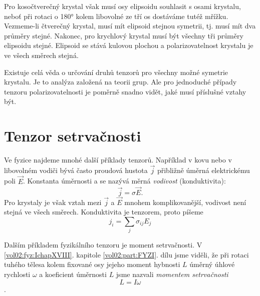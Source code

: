     Pro kosočtverečný krystal však musí osy elipsoidu souhlasit s osami krystalu, neboť při rotaci o
    \ang{180} kolem libovolné ze tří os dostáváme tutéž mřížku. Vezmeme-li čtverečný krystal, musí
    mít elipsoid stejnou symetrii, tj. musí mít dva průměry stejné. Nakonec, pro krychlový krystal
    musí být všechny tři průměry elipsoidu stejné. Elipsoid se stává kulovou plochou a
    polarizovatelnost krystalu je ve všech směrech stejná.
    
    Existuje celá věda o určování druhů tenzorů pro všechny možné symetrie krystalu. Je to analýza
    založená na teorii grup. Ale pro jednoduché případy tenzoru polarizovatelnosti je poměrně snadno
    vidět, jaké musí příslušné vztahy být.

  \section{Tenzor setrvačnosti}\label{fyz:IIchapXXXIsecIV} 
  
    Ve fyzice najdeme mnohé další příklady tenzorů. Například v kovu nebo v libovolném vodiči bývá
    často proudová hustota \(\vec{j}\) přibližně úměrná elektrickému poli \(\vec{E}\). Konstanta
    úměrnosti a se nazývá měrná \emph{vodivost} (konduktivita):
    \begin{equation*}
      \vec{j} = \sigma\vec{E}.
    \end{equation*}
    Pro krystaly je však vztah mezi \(\vec{j}\) a \(\vec{E}\) mnohem komplikovanější, vodivost není
    stejná ve všech směrech. Konduktivita je tenzorem, proto píšeme
    \begin{equation*}
      j_i = \sum_j\sigma_{ij}E_j
    \end{equation*}

    Dalším příkladem fyzikálního tenzoru je moment setrvačnosti. V \ref{vol02:fyz:IchapXVIII}. kapitole
    \ref{vol02:part:FYZI}. dílu jsme viděli, že při rotaci tuhého tělesa kolem fixované osy jejeho moment
    hybnosti \(L\) úměrný úhlové rychlosti \(ω\) a koeficient úměrnosti \(L\) jsme nazvali
    \emph{momentem setrvačnosti} \[L=I\omega\].

